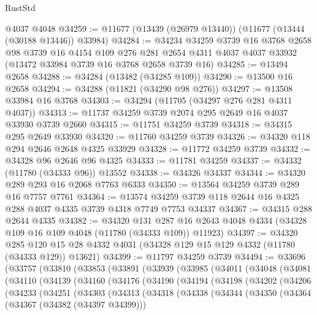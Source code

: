 \begin{lexlean}{RustStd}
\begin{coremodule}
    @4037
    @4048
@34259 := @11677 (@13439 (@26979 @13440)) (@11677 (@13444 (@30188 @13446)) @33984)
@34284 := @34234
    @34259
    @3739
    @16
    @3768
    @2658
    @98
    @3739
    @16
    @4154
    @109
    @276
    @281
    @2654
    @4311
    @4037
    @4037
    @33932
    (@13472 @33984 @3739 @16 @3768 @2658 @3739 @16)
@34285 := @13494 @2658
@34288 := @34284 (@13482 (@34285 @109))
@34290 := @13500 @16 @2658
@34294 := @34288 (@11821 (@34290 @98 @276))
@34297 := @13508 @33984 @16 @3768
@34303 := @34294 (@11705 (@34297 @276 @281 @4311 @4037))
@34313 := @11737 @34259 @3739 @2074 @295 @2649 @16 @4037 @33930 @3739 @2660
@34315 := @11751 @34259 @3739
@34318 := @34315 @295 @2649 @33930
@34320 := @11760 @34259 @3739
@34326 := @34320 @118 @294 @2646 @2648 @4325 @33929
@34328 := @11772 @34259 @3739
@34332 := @34328 @96 @2646 @96 @4325
@34333 := @11781 @34259
@34337 := @34332 (@11780 (@34333 @96)) @13552
@34338 := @34326 @34337
@34344 := @34320 @289 @293 @16 @2068 @7763 @6333
@34350 := @13564 @34259 @3739 @289 @16 @7757 @7761
@34364 := @13574 @34259 @3739 @118 @2644 @16 @4325 @288 @4037 @4335 @3739 @4318 @7749 @7753 @34337
@34367 := @34315 @288 @2644 @4335
@34382 := @34320
    @131
    @287
    @16
    @2643
    @4048
    @4334
    (@34328 @109 @16 @109 @4048 (@11780 (@34333 @109)) @11923)
@34397 := @34320
    @285
    @120
    @15
    @28
    @4332
    @4031
    (@34328 @129 @15 @129 @4332 (@11780 (@34333 @129)) @13621)
@34399 := @11797 @34259 @3739
@34494 := @33696
    (@33757
      (@33810
        (@33853
          (@33891
            (@33939
              (@33985
                (@34011
                  (@34048
                    (@34081
                      (@34110
                        (@34139
                          (@34160
                            (@34176
                              (@34190
                                (@34194
                                  (@34198
                                    (@34202
                                      (@34206
                                        (@34233
                                          (@34251
                                            (@34303
                                              (@34313
                                                (@34318
                                                  (@34338
                                                    (@34344
                                                      (@34350
                                                        (@34364
                                                          (@34367 (@34382 (@34397 @34399)))

\end{coremodule}
\end{lexlean}

